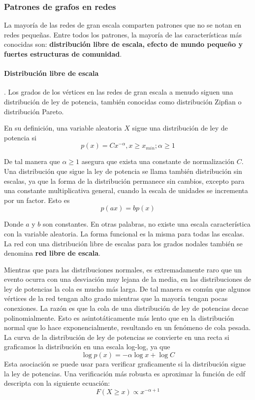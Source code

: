 \subsubsection{Patrones de grafos en redes}
La mayoría de las redes de gran escala comparten patrones que no se notan en redes pequeñas. Entre todos los patrones, la mayoría de las características más conocidas son: \textbf{distribución libre de escala, efecto de mundo pequeño y fuertes estructuras de comunidad}.\cite{Tang2010}

\paragraph{Distribución libre de escala} \cite{Tang2010}.
\label{par:definicion-libre-escala}
Los grados de los vértices en las redes de gran escala a menudo siguen una distribución de ley de potencia, también conocidas como distribución Zipfian o distribución Pareto. 

En su definición, una variable aleatoria $X$ sigue una distribución de ley de potencia si
\begin{equation}
p(x)=Cx^{-\alpha}, x\geq  x_{min}; \alpha \geq 1
\end{equation}

De tal manera que $\alpha \geq 1$ asegura que exista una constante de normalización $C$. Una distribución que sigue la ley de potencia se llama también  distribución sin escalas, ya que la forma de la distribución permanece sin cambios, excepto para una constante multiplicativa general, cuando la escala de unidades se incrementa por un factor. Esto es
\begin{equation}
p(ax)=bp(x)
\end{equation}
 
Donde $a$ y $b$ son constantes. En otras palabras, no existe una escala característica con la variable aleatoria. La forma funcional es la misma para todas las escalas. La red con una distribución libre de escalas para los grados nodales también se denomina \textbf{red libre de escala}.
 
Mientras que para las distribuciones normales, es extremadamente raro que un evento ocurra con una desviación muy lejana de la media, en las distribuciones de ley de potencias la cola es mucho más larga. De tal manera es común que algunos vértices de la red tengan alto grado mientras que la mayoría tengan pocas conexiones. La razón es que la cola de una distribución de ley de potencias decae polinomialmente. Esto es asintotáticamente más lento que en la distribución normal que lo hace exponencialmente, resultando en un fenómeno de cola pesada. La curva de la distribución de ley de potencias se convierte en una recta si graficamos la distribución en una escala log-log, ya que
\begin{equation}
\log p(x) =-\alpha \log x + \log C
\end{equation}
Esta asociación se puede usar para verificar graficamente si la distribución sigue la ley de potencias. Una verificación más robusta es aproximar la función de \acrfull{cdf} descripta con la siguiente ecuación:
\begin{equation}
F(X\geq x) \propto  x^{-\alpha+1 }
\end{equation}


